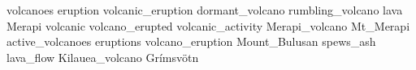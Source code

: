 volcanoes eruption volcanic\_eruption dormant\_volcano rumbling\_volcano lava Merapi volcanic volcano\_erupted volcanic\_activity Merapi\_volcano Mt\_Merapi active\_volcanoes eruptions volcano\_eruption Mount\_Bulusan spews\_ash lava\_flow Kilauea\_volcano Grímsvötn 
